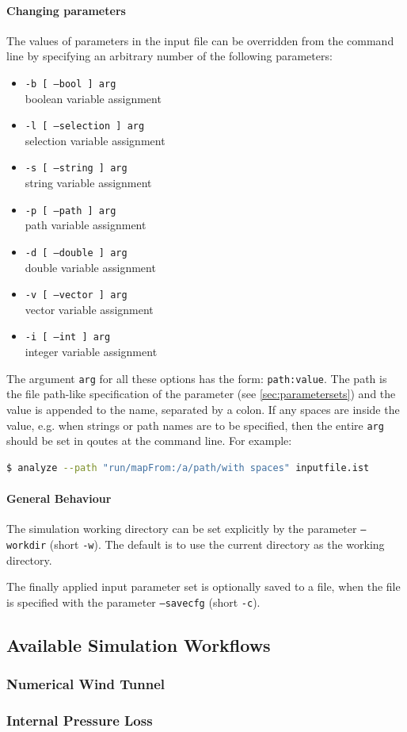 \paragraph{Changing parameters}
The values of parameters in the input file can be overridden from the command line by specifying an arbitrary number of the following parameters:
\begin{itemize}
\item \texttt{-b [ --bool ] arg}\\ boolean variable assignment
\item \texttt{-l [ --selection ] arg }\\selection variable assignment
\item \texttt{-s [ --string ] arg}\\string variable assignment
\item \texttt{-p [ --path ] arg}\\path variable assignment
\item \texttt{-d [ --double ] arg}\\double variable assignment
\item \texttt{-v [ --vector ] arg}\\vector variable assignment
\item \texttt{-i [ --int ] arg}\\integer variable assignment
\end{itemize}

The argument \texttt{arg} for all these options has the form:
\texttt{path:value}.
The path is the file path-like specification of the parameter (see \ref{sec:parametersets}) and the value is appended to the name, separated by a colon.
If any spaces are inside the value, e.g. when strings or path names are to be specified, then the entire \texttt{arg} should be set in qoutes at the command line. For example:
\begin{lstlisting}[language=bash]
$ analyze --path "run/mapFrom:/a/path/with spaces" inputfile.ist
\end{lstlisting}

\paragraph{General Behaviour}

The simulation working directory can be set explicitly by the parameter \texttt{--workdir} (short \texttt{-w}). 
The default is to use the current directory as the working directory.

The finally applied input parameter set is optionally saved to a file, when the file is specified with the parameter \texttt{--savecfg} (short \texttt{-c}).

\subsection{Available Simulation Workflows}

\subsubsection{Numerical Wind Tunnel}

\subsubsection{Internal Pressure Loss}
